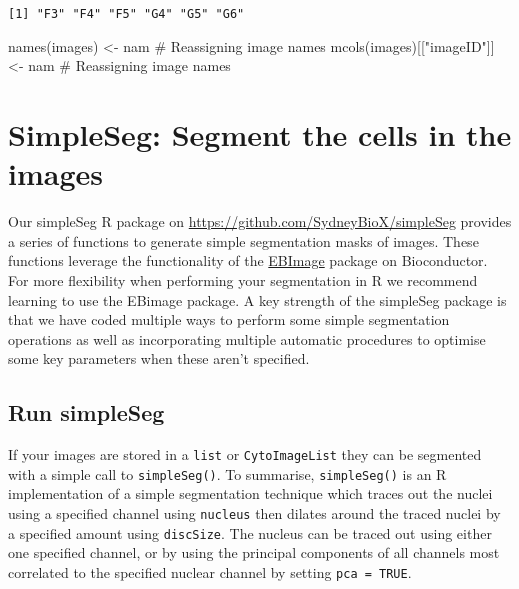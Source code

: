 \documentclass[
  letterpaper,
  DIV=11,
  numbers=noendperiod]{scrreprt}
\newenvironment{Shaded}{\begin{snugshade}}{\end{snugshade}}
\newcommand{\CommentTok}[1]{\textcolor[rgb]{0.37,0.37,0.37}{#1}}
\newcommand{\FunctionTok}[1]{\textcolor[rgb]{0.28,0.35,0.67}{#1}}
\newcommand{\NormalTok}[1]{\textcolor[rgb]{0.00,0.23,0.31}{#1}}
\newcommand{\OtherTok}[1]{\textcolor[rgb]{0.00,0.23,0.31}{#1}}
\newcommand{\StringTok}[1]{\textcolor[rgb]{0.13,0.47,0.30}{#1}}
\begin{document}
\begin{verbatim}
[1] "F3" "F4" "F5" "G4" "G5" "G6"
\end{verbatim}

\begin{Shaded}
\begin{Highlighting}[]
\FunctionTok{names}\NormalTok{(images) }\OtherTok{\textless{}{-}}\NormalTok{ nam }\CommentTok{\# Reassigning image names}
\FunctionTok{mcols}\NormalTok{(images)[[}\StringTok{"imageID"}\NormalTok{]] }\OtherTok{\textless{}{-}}\NormalTok{ nam }\CommentTok{\# Reassigning image names}
\end{Highlighting}
\end{Shaded}

\section{SimpleSeg: Segment the cells in the
images}\label{simpleseg-segment-the-cells-in-the-images}

Our simpleSeg R package on \url{https://github.com/SydneyBioX/simpleSeg}
provides a series of functions to generate simple segmentation masks of
images. These functions leverage the functionality of the
\href{https://bioconductor.org/packages/release/bioc/vignettes/EBImage/inst/doc/EBImage-introduction.html}{EBImage}
package on Bioconductor. For more flexibility when performing your
segmentation in R we recommend learning to use the EBimage package. A
key strength of the simpleSeg package is that we have coded multiple
ways to perform some simple segmentation operations as well as
incorporating multiple automatic procedures to optimise some key
parameters when these aren't specified.

\subsection{Run simpleSeg}\label{run-simpleseg}

If your images are stored in a \texttt{list} or \texttt{CytoImageList}
they can be segmented with a simple call to \texttt{simpleSeg()}. To
summarise, \texttt{simpleSeg()} is an R implementation of a simple
segmentation technique which traces out the nuclei using a specified
channel using \texttt{nucleus} then dilates around the traced nuclei by
a specified amount using \texttt{discSize}. The nucleus can be traced
out using either one specified channel, or by using the principal
components of all channels most correlated to the specified nuclear
channel by setting \texttt{pca\ =\ TRUE}.
\end{document}
